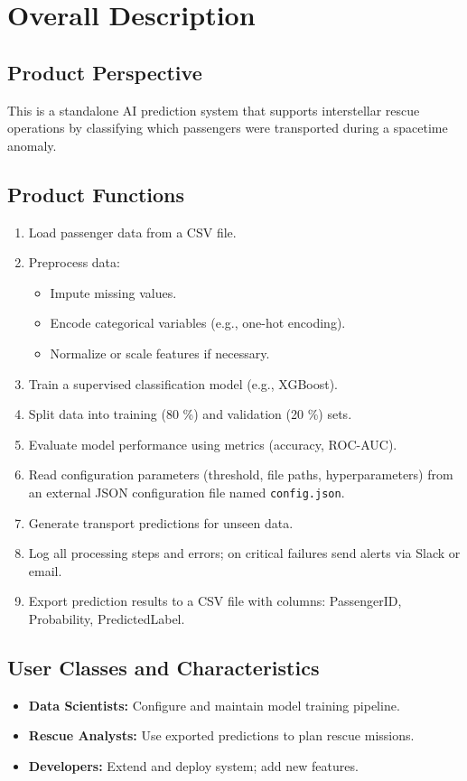 \documentclass[15pt]{article}
\begin{document}
\section{Overall Description}
\subsection{Product Perspective}
This is a standalone AI prediction system that supports interstellar rescue operations by classifying which passengers were transported during a spacetime anomaly.

\subsection{Product Functions}
\begin{enumerate}[label=PF\arabic*:]
  \item Load passenger data from a CSV file.
  \item Preprocess data:
    \begin{itemize}
      \item Impute missing values.
      \item Encode categorical variables (e.g., one-hot encoding).
      \item Normalize or scale features if necessary.
    \end{itemize}
  \item Train a supervised classification model (e.g., XGBoost).
  \item Split data into training (80 \%) and validation (20 \%) sets.
  \item Evaluate model performance using metrics (accuracy, ROC-AUC).
  \item Read configuration parameters (threshold, file paths, hyperparameters) from an external JSON configuration file named \texttt{config.json}.
  \item Generate transport predictions for unseen data.
  \item Log all processing steps and errors; on critical failures send alerts via Slack or email.
  \item Export prediction results to a CSV file with columns: PassengerID, Probability, PredictedLabel.
\end{enumerate}

\subsection{User Classes and Characteristics}
\begin{itemize}
  \item \textbf{Data Scientists:} Configure and maintain model training pipeline.
  \item \textbf{Rescue Analysts:} Use exported predictions to plan rescue missions.
  \item \textbf{Developers:} Extend and deploy system; add new features.
\end{itemize}
\end{document}
